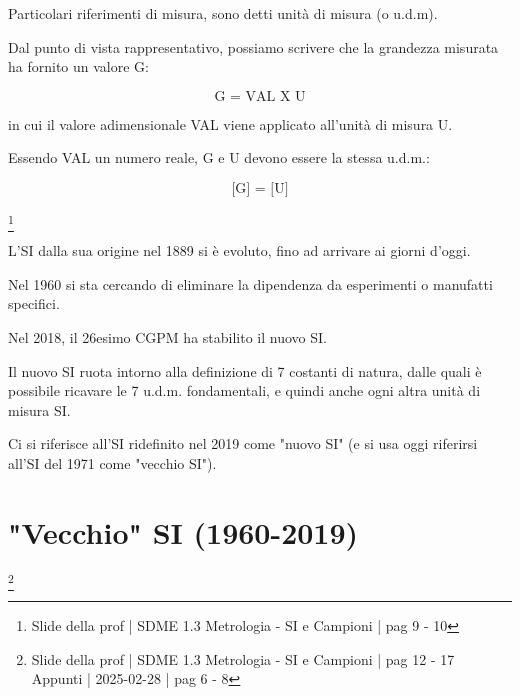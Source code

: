 Particolari riferimenti di misura, sono detti unità di misura (o u.d.m). \newline 

Dal punto di vista rappresentativo, possiamo scrivere che la grandezza misurata ha fornito un valore G: 

{
    \Large 
    \begin{equation}
        \text{G = VAL X U}
    \end{equation}
    
}

in cui il valore adimensionale VAL viene applicato all'unità di misura U. \newline 

Essendo VAL un numero reale, G e U devono essere la stessa u.d.m.:  \\

{
    \Large 
    \begin{equation}
        \text{[G] = [U]}
    \end{equation}
    
}


\newpage

\footnote{Slide della prof | SDME 1.3 Metrologia - SI e Campioni | pag 9 - 10}

L'SI dalla sua origine nel 1889 si è evoluto, fino ad arrivare ai giorni d'oggi. \newline 

Nel 1960 si sta cercando di eliminare la dipendenza da esperimenti o manufatti specifici. \newline 

Nel 2018, il 26esimo CGPM ha stabilito il nuovo SI. \newline 

Il nuovo SI ruota intorno alla definizione di 7 costanti di natura, 
dalle quali è possibile ricavare le 7 u.d.m. fondamentali, 
e quindi anche ogni altra unità di misura SI. \newline 

Ci si riferisce all'SI ridefinito nel 2019 come "nuovo SI" (e si usa oggi riferirsi all'SI del 1971 come "vecchio SI"). \newline

\newpage 

\section{"Vecchio" SI (1960-2019)}
\footnote{Slide della prof | SDME 1.3 Metrologia - SI e Campioni | pag 12 - 17 \\  
Appunti | 2025-02-28 | pag 6 - 8}

